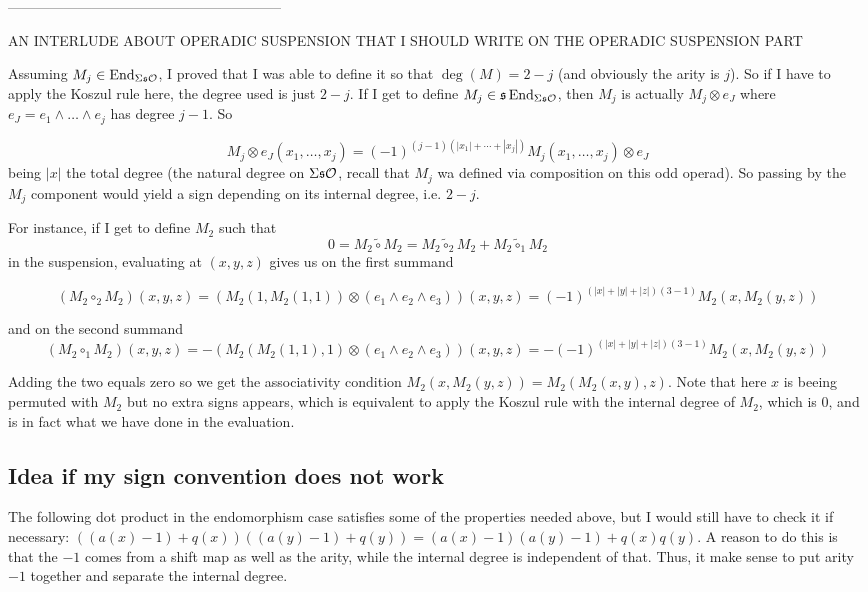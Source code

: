 \documentclass[twoside]{article}
\begin{document}
\begin{remark}
-----------------------------------------------------------

AN INTERLUDE ABOUT OPERADIC SUSPENSION THAT I SHOULD WRITE ON THE OPERADIC SUSPENSION PART

Assuming $M_j\in \operatorname{End}_{\Sigma\mathfrak{s}{\mathcal O}}$, I proved that I was able to define it so that $\deg(M)=2-j$ (and obviously the arity is $j$). So if I have to apply the Koszul rule here, the degree used is just $2-j$. If I get to define $M_j\in\mathfrak{s}\operatorname{End}_{\Sigma\mathfrak{s}{\mathcal O}}$, then $M_j$ is actually $M_j\otimes e_J$ where $e_J=e_1\land\dots\land e_j$ has degree $j-1$. So 

$$M_j\otimes e_J(x_1,\dots, x_j)=(-1)^{(j-1)(|x_1|+\cdots+|x_j|)}M_j(x_1,\dots, x_j)\otimes e_J$$
being $|x|$ the total degree (the natural degree on $\Sigma\mathfrak{s}{\mathcal O}$, recall that $M_j$ wa defined via composition on this odd operad). So passing by the $M_j$ component would yield a sign depending on its internal degree, i.e. $2-j$.

For instance, if I get to define $M_2$ such that $$0=M_2\tilde{\circ}M_2=M_2\tilde{\circ}_2 M_2+M_2\tilde{\circ}_1 M_2$$ in the suspension, evaluating at $(x,y,z)$ gives us on the first summand

$$(M_2\circ_2M_2)(x,y,z)=(M_2(1,M_2(1,1))\otimes (e_1\land e_2\land e_3))(x,y,z)=(-1)^{(|x|+|y|+|z|)(3-1)}M_2(x,M_2(y,z))$$

and on the second summand
$$(M_2\circ_1M_2)(x,y,z)=-(M_2(M_2(1,1),1)\otimes (e_1\land e_2\land e_3))(x,y,z)=-(-1)^{(|x|+|y|+|z|)(3-1)}M_2(x,M_2(y,z))$$

Adding the two equals zero so we get the associativity condition $M_2(x,M_2(y,z))=M_2(M_2(x,y),z)$. Note that here $x$ is beeing permuted with $M_2$ but no extra signs appears, which is equivalent to apply the Koszul rule with the internal degree of $M_2$, which is $0$, and is in fact what we have done in the evaluation.

\end{remark}
\subsection{Idea if my sign convention does not work}

The following dot product in the endomorphism case satisfies some of the properties needed above, but I would still have to check it if necessary: $((a(x)-1)+q(x))((a(y)-1)+q(y))=(a(x)-1)(a(y)-1)+q(x)q(y)$. A reason to do this is that the $-1$ comes from a shift map as well as the arity, while the internal degree is independent of that. Thus, it make sense to put arity $-1$ together and separate the internal degree.
\end{document}
